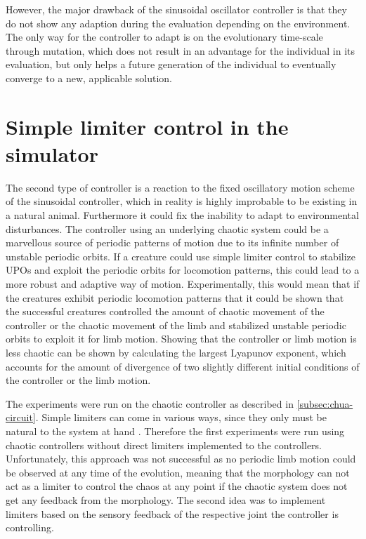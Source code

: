 \documentclass[main]{subfiles}
\begin{document}
However, the major drawback of the sinusoidal oscillator controller is that they do not show any adaption during the evaluation depending on the environment. %
%
The only way for the controller to adapt is on the evolutionary time-scale through mutation, which does not result in an advantage for the individual in its evaluation, but only helps a future generation of the individual to eventually converge to a new, applicable solution.

\section{Simple limiter control in the simulator}

The second type of controller is a reaction to the fixed oscillatory motion scheme of the sinusoidal controller, which in reality is highly improbable to be existing in a natural animal. %
%
Furthermore it could fix the inability to adapt to environmental disturbances. %
%
The controller using an underlying chaotic system could be a marvellous source of periodic patterns of motion due to its infinite number of unstable periodic orbits. %
%
If a creature could use simple limiter control to stabilize UPOs and exploit the periodic orbits for locomotion patterns, this could lead to a more robust and adaptive way of motion. %
%
Experimentally, this would mean that if the creatures exhibit periodic locomotion patterns that it could be shown that the successful creatures controlled the amount of chaotic movement of the controller or the chaotic movement of the limb and stabilized unstable periodic orbits to exploit it for limb motion. %
%
Showing that the controller or limb motion is less chaotic can be shown by calculating the largest Lyapunov exponent, which accounts for the amount of divergence of two slightly different initial conditions of the controller or the limb motion.

The experiments were run on the chaotic controller as described in \ref{subsec:chua-circuit}. %
%
Simple limiters can come in various ways, since they only must be natural to the system at hand \cite{bib:Corron2000}. %
%
Therefore the first experiments were run using chaotic controllers without direct limiters implemented to the controllers. %
%
Unfortunately, this approach was not successful as no periodic limb motion could be observed at any time of the evolution, meaning that the morphology can not act as a limiter to control the chaos at any point if the chaotic system does not get any feedback from the morphology. %
%
The second idea was to implement limiters based on the sensory feedback of the respective joint the controller is controlling.
\end{document}
